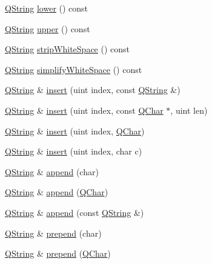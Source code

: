 \begin{DoxyCompactItemize}
\item 
\mbox{\hyperlink{class_q_string}{Q\+String}} \mbox{\hyperlink{class_q_string_a77d8e8901007cdda3a71b40d42dbc32c}{lower}} () const
\item 
\mbox{\hyperlink{class_q_string}{Q\+String}} \mbox{\hyperlink{class_q_string_a4830365186780874b6e160213a422af8}{upper}} () const
\item 
\mbox{\hyperlink{class_q_string}{Q\+String}} \mbox{\hyperlink{class_q_string_abc241c312bf04d7556ae830fc0f53d31}{strip\+White\+Space}} () const
\item 
\mbox{\hyperlink{class_q_string}{Q\+String}} \mbox{\hyperlink{class_q_string_ad8e481726eb5a5f368eb1bb23c875847}{simplify\+White\+Space}} () const
\item 
\mbox{\hyperlink{class_q_string}{Q\+String}} \& \mbox{\hyperlink{class_q_string_a3733066010481ab1e8f037bd99045269}{insert}} (uint index, const \mbox{\hyperlink{class_q_string}{Q\+String}} \&)
\item 
\mbox{\hyperlink{class_q_string}{Q\+String}} \& \mbox{\hyperlink{class_q_string_aa1047c2887779c9bce2e6c09adf53432}{insert}} (uint index, const \mbox{\hyperlink{class_q_char}{Q\+Char}} $\ast$, uint len)
\item 
\mbox{\hyperlink{class_q_string}{Q\+String}} \& \mbox{\hyperlink{class_q_string_add1ccd76184e93c88d2941cf6e5cd22e}{insert}} (uint index, \mbox{\hyperlink{class_q_char}{Q\+Char}})
\item 
\mbox{\hyperlink{class_q_string}{Q\+String}} \& \mbox{\hyperlink{class_q_string_a2a54fe338baa21cba270e207f9edef97}{insert}} (uint index, char c)
\item 
\mbox{\hyperlink{class_q_string}{Q\+String}} \& \mbox{\hyperlink{class_q_string_a5e251de7eb95440be1fed6e0afef0638}{append}} (char)
\item 
\mbox{\hyperlink{class_q_string}{Q\+String}} \& \mbox{\hyperlink{class_q_string_a1f09a541ae63558a63be07fb2c6b6e58}{append}} (\mbox{\hyperlink{class_q_char}{Q\+Char}})
\item 
\mbox{\hyperlink{class_q_string}{Q\+String}} \& \mbox{\hyperlink{class_q_string_a212b80401444eb3f67321fb55ddf64d5}{append}} (const \mbox{\hyperlink{class_q_string}{Q\+String}} \&)
\item 
\mbox{\hyperlink{class_q_string}{Q\+String}} \& \mbox{\hyperlink{class_q_string_a960e7c9c3ead447bd3da1332ca06a796}{prepend}} (char)
\item 
\mbox{\hyperlink{class_q_string}{Q\+String}} \& \mbox{\hyperlink{class_q_string_a31c38932a11a53c4d56bd286786cb1ed}{prepend}} (\mbox{\hyperlink{class_q_char}{Q\+Char}})

\end{DoxyCompactItemize}
